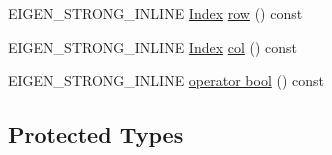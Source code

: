 \begin{DoxyCompactItemize}
\item 
E\+I\+G\+E\+N\+\_\+\+S\+T\+R\+O\+N\+G\+\_\+\+I\+N\+L\+I\+NE \hyperlink{namespace_eigen_a62e77e0933482dafde8fe197d9a2cfde}{Index} \hyperlink{class_eigen_1_1_inner_iterator_a3ab6f3afdf62740623cdc9ecb14dc132}{row} () const
\item 
E\+I\+G\+E\+N\+\_\+\+S\+T\+R\+O\+N\+G\+\_\+\+I\+N\+L\+I\+NE \hyperlink{namespace_eigen_a62e77e0933482dafde8fe197d9a2cfde}{Index} \hyperlink{class_eigen_1_1_inner_iterator_a1d2ccb720e90bc6928064cc30c41fb93}{col} () const
\item 
E\+I\+G\+E\+N\+\_\+\+S\+T\+R\+O\+N\+G\+\_\+\+I\+N\+L\+I\+NE \hyperlink{class_eigen_1_1_inner_iterator_a0f11df2dfcd1c48c54aa29e605c09310}{operator bool} () const
\end{DoxyCompactItemize}
\subsection*{Protected Types}
